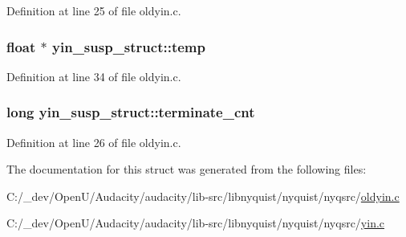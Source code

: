 Definition at line 25 of file oldyin.\+c.

\subsubsection[{\texorpdfstring{temp}{temp}}]{\setlength{\rightskip}{0pt plus 5cm}float $\ast$ yin\+\_\+susp\+\_\+struct\+::temp}\hypertarget{structyin__susp__struct_aefb3a784c4e0854229044f3d45bd613e}{}\label{structyin__susp__struct_aefb3a784c4e0854229044f3d45bd613e}


Definition at line 34 of file oldyin.\+c.

\subsubsection[{\texorpdfstring{terminate\+\_\+cnt}{terminate_cnt}}]{\setlength{\rightskip}{0pt plus 5cm}long yin\+\_\+susp\+\_\+struct\+::terminate\+\_\+cnt}\hypertarget{structyin__susp__struct_ae0dc53f4b8e251a1e1e2ba540151f221}{}\label{structyin__susp__struct_ae0dc53f4b8e251a1e1e2ba540151f221}


Definition at line 26 of file oldyin.\+c.



The documentation for this struct was generated from the following files\+:\begin{DoxyCompactItemize}
\item 
C\+:/\+\_\+dev/\+Open\+U/\+Audacity/audacity/lib-\/src/libnyquist/nyquist/nyqsrc/\hyperlink{oldyin_8c}{oldyin.\+c}\item 
C\+:/\+\_\+dev/\+Open\+U/\+Audacity/audacity/lib-\/src/libnyquist/nyquist/nyqsrc/\hyperlink{yin_8c}{yin.\+c}\end{DoxyCompactItemize}
